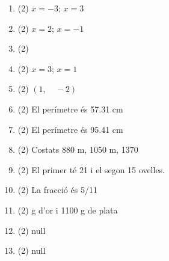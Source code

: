 \documentclass[a4paper]{article},
\begin{document}
\begin{enumerate}
\begin{tasks}
    \end{tasks}
    \item 
    \begin{tasks}(2)
      \task $x=-3$; $x=3$
    \end{tasks}
    \item 
    \begin{tasks}(2)
      \task $x=2$; $x=-1$
    \end{tasks}
    \item 
    \begin{tasks}(2)
    \end{tasks}
    \item 
    \begin{tasks}(2)
      \task $x=3$; $x=1$
    \end{tasks}
    \item 
    \begin{tasks}(2)
      \task $ \left(1, \quad -2 \right)$
    \end{tasks}
    \item 
    \begin{tasks}(2)
      \task El perímetre és 57.31 cm
    \end{tasks}
    \item 
    \begin{tasks}(2)
      \task El perímetre és 95.41 cm
    \end{tasks}
    \item 
    \begin{tasks}(2)
      \task Costats 880 m, 1050 m, 1370
    \end{tasks}
    \item 
    \begin{tasks}(2)
      \task El primer té 21 i el segon 15 ovelles.
    \end{tasks}
    \item 
    \begin{tasks}(2)
      \task La fracció és 5/11
    \end{tasks}
    \item 
    \begin{tasks}(2)
       g d'or i 1100 g de plata
    \end{tasks}
    \item 
    \begin{tasks}(2)
      \task null
    \end{tasks}
    \item 
    \begin{tasks}(2)
      \task null
    \end{tasks}
  \end{enumerate}
\end{document}
